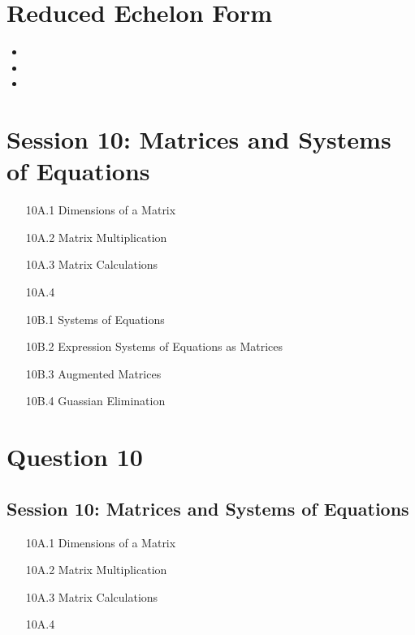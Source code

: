 \documentclass[]{report}
\begin{document}
\section*{Reduced Echelon Form}

\begin{itemize}
	\item
	\item
	\item
\end{itemize}


					\section*{Session 10: Matrices and Systems of Equations}
					\begin{itemize}
						\item[10A.1] Dimensions of a Matrix
						\item[10A.2] Matrix Multiplication
						\item[10A.3] Matrix Calculations
						\item[10A.4] 
					\end{itemize}
					
					\begin{itemize}
						\item[10B.1] Systems of Equations
						\item[10B.2] Expression Systems of Equations as Matrices
						\item[10B.3] Augmented Matrices
						\item[10B.4] Guassian Elimination
					\end{itemize}
					
					
					
					
					
					
					
					
					
					
					
					
					
					
					
					
					
					
					
\section*{Question 10}

\subsection*{Session 10: Matrices and Systems of Equations}
\begin{itemize}
	\item[10A.1] Dimensions of a Matrix
	\item[10A.2] Matrix Multiplication
	\item[10A.3] Matrix Calculations
	\item[10A.4] 
\end{itemize}
\end{document}
